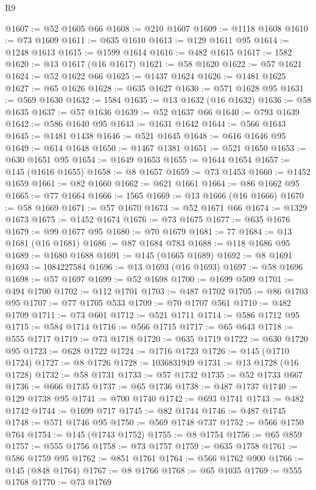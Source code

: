 \begin{lexlean}{R9}
\begin{coremodule}
@1607 := @52 @1605 @66
@1608 := @210 @1607
@1609 := @1118 @1608
@1610 := @73 @1609
@1611 := @635 @1610
@1613 := @129 @1611 @95
@1614 := @1248 @1613
@1615 := @1599 @1614
@1616 := @482 @1615
@1617 := 1582
@1620 := @13 @1617 (@16 @1617)
@1621 := @58 @1620
@1622 := @57 @1621
@1624 := @52 @1622 @66
@1625 := @1437 @1624
@1626 := @1481 @1625
@1627 := @65 @1626
@1628 := @635 @1627
@1630 := @571 @1628 @95
@1631 := @569 @1630
@1632 := 1584
@1635 := @13 @1632 (@16 @1632)
@1636 := @58 @1635
@1637 := @57 @1636
@1639 := @52 @1637 @66
@1640 := @793 @1639
@1642 := @586 @1640 @95
@1643 := @1631 @1642
@1644 := @566 @1643
@1645 := @1481 @1438
@1646 := @521 @1645
@1648 := @616 @1646 @95
@1649 := @614 @1648
@1650 := @1467 @1381
@1651 := @521 @1650
@1653 := @630 @1651 @95
@1654 := @1649 @1653
@1655 := @1644 @1654
@1657 := @145 (@1616 @1655)
@1658 := @8 @1657
@1659 := @73 @1453
@1660 := @1452 @1659
@1661 := @82 @1660
@1662 := @621 @1661
@1664 := @86 @1662 @95
@1665 := @77 @1664
@1666 := 1565
@1669 := @13 @1666 (@16 @1666)
@1670 := @58 @1669
@1671 := @57 @1670
@1673 := @52 @1671 @66
@1674 := @1329 @1673
@1675 := @1452 @1674
@1676 := @73 @1675
@1677 := @635 @1676
@1679 := @99 @1677 @95
@1680 := @70 @1679
@1681 := 77
@1684 := @13 @1681 (@16 @1681)
@1686 := @87 @1684 @783
@1688 := @118 @1686 @95
@1689 := @1680 @1688
@1691 := @145 (@1665 @1689)
@1692 := @8 @1691
@1693 := 1084227584
@1696 := @13 @1693 (@16 @1693)
@1697 := @58 @1696
@1698 := @57 @1697
@1699 := @52 @1698
@1700 := @1699 @509
@1701 := @494 @1700
@1702 := @112 @1701
@1703 := @487 @1702
@1705 := @86 @1703 @95
@1707 := @77 @1705 @533
@1709 := @70 @1707 @561
@1710 := @482 @1709
@1711 := @73 @601
@1712 := @521 @1711
@1714 := @586 @1712 @95
@1715 := @584 @1714
@1716 := @566 @1715
@1717 := @65 @643
@1718 := @555 @1717
@1719 := @73 @1718
@1720 := @635 @1719
@1722 := @630 @1720 @95
@1723 := @628 @1722
@1724 := @1716 @1723
@1726 := @145 (@1710 @1724)
@1727 := @8 @1726
@1728 := 1036831949
@1731 := @13 @1728 (@16 @1728)
@1732 := @58 @1731
@1733 := @57 @1732
@1735 := @52 @1733 @667
@1736 := @666 @1735
@1737 := @65 @1736
@1738 := @487 @1737
@1740 := @129 @1738 @95
@1741 := @700 @1740
@1742 := @693 @1741
@1743 := @482 @1742
@1744 := @1699 @717
@1745 := @82 @1744
@1746 := @487 @1745
@1748 := @571 @1746 @95
@1750 := @569 @1748 @737
@1752 := @566 @1750 @764
@1754 := @145 (@1743 @1752)
@1755 := @8 @1754
@1756 := @65 @859
@1757 := @555 @1756
@1758 := @73 @1757
@1759 := @635 @1758
@1761 := @586 @1759 @95
@1762 := @851 @1761
@1764 := @566 @1762 @900
@1766 := @145 (@848 @1764)
@1767 := @8 @1766
@1768 := @65 @1035
@1769 := @555 @1768
@1770 := @73 @1769

\end{coremodule}
\end{lexlean}
